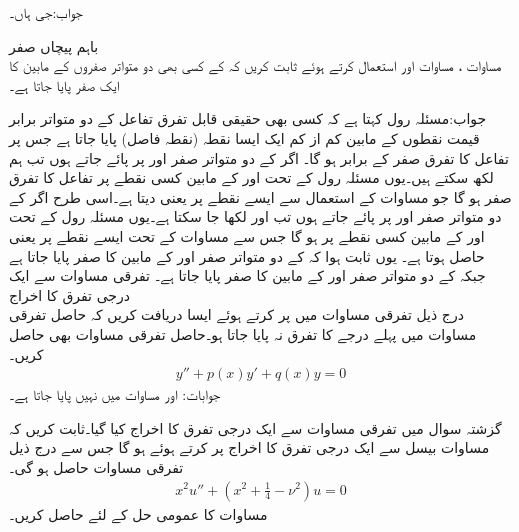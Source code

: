 جواب:جی ہاں۔

\quad باہم پیچاں صفر\\
مساوات ، مساوات  اور  استعمال کرتے ہوئے ثابت کریں کہ  کے کسی بھی دو متواتر صفروں کے مابین  کا ایک صفر پایا جاتا ہے۔ 

جواب:مسئلہ رول کہتا ہے کہ کسی بھی حقیقی قابل تفرق تفاعل کے دو متواتر برابر قیمت نقطوں کے مابین کم از کم ایک ایسا نقطہ (نقطہ فاصل) پایا جاتا ہے جس پر تفاعل کا تفرق صفر کے برابر ہو گا۔ اگر  کے دو متواتر صفر  اور  پر پائے جاتے ہوں تب ہم  لکھ سکتے ہیں۔یوں مسئلہ رول کے تحت  اور  کے مابین کسی نقطے پر تفاعل  کا تفرق صفر  ہو گا جو مساوات  کے استعمال سے ایسے نقطے پر  یعنی  دیتا ہے۔اسی طرح اگر  کے دو متواتر صفر  اور  پر پائے جاتے ہوں تب  اور  لکھا جا سکتا ہے۔یوں مسئلہ رول کے تحت  اور  کے مابین کسی نقطے پر  ہو گا جس سے مساوات  کے تحت ایسے نقطے پر  یعنی  حاصل ہوتا ہے۔ یوں  ثابت ہوا کہ  کے دو متواتر صفر  اور  کے مابین  کا صفر پایا جاتا ہے جبکہ  کے دو متواتر صفر  اور  کے مابین  کا صفر پایا جاتا ہے۔
\quad تفرقی مساوات سے ایک درجی تفرق کا اخراج\\
 درج ذیل تفرقی مساوات میں  پر کرتے ہوئے ایسا  دریافت کریں کہ حاصل تفرقی مساوات میں پہلے درجے کا تفرق نہ پایا جاتا ہو۔حاصل تفرقی مساوات بھی حاصل کریں۔
\begin{align*}
y''+p(x)y'+q(x)y=0
\end{align*}
جوابات: اور مساوات  میں  نہیں پایا جاتا ہے۔

گزشتہ سوال میں تفرقی مساوات سے ایک درجی تفرق کا اخراج کیا گیا۔ثابت کریں کہ مساوات بیسل  سے ایک درجی تفرق کا اخراج  پر کرتے ہوئے ہو گا جس سے درج ذیل تفرقی مساوات حاصل ہو گی۔
\begin{align}\label{مساوات_بیسل_سادہ_صورت}
x^2u''+(x^2+\tfrac{1}{4}-\nu^2)u=0
\end{align}
مساوات  کا عمومی حل  کے لئے حاصل کریں۔

